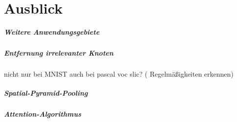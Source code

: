 \chapter{Ausblick}
\label{ausblick}

\paragraph{Weitere Anwendungsgebiete}
\label{weitere_anwendungsgebiete}

\paragraph{Entfernung irrelevanter Knoten}
\label{entfernung_irrelevanter_knoten}

nicht nur bei MNIST
auch bei pascal voc slic? (\zB{} Regelmäßigkeiten erkennen)

\paragraph{Spatial-Pyramid-Pooling}
\label{spatial_pyramid_pooling}

\paragraph{Attention-Algorithmus}
\label{attention_algorithmus}
